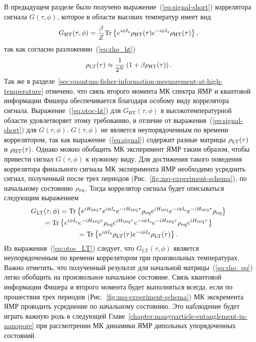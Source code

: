 В предыдущем разделе было получено выражение~(\ref{eq:signal-short}) коррелятора сигнала $G(\tau, \phi)$,
которое в области высоких температур имеет вид
%
\begin{equation}\label{eq:otoc-ht}
    G_\mathrm{HT}(\tau, \phi) = \frac \beta Z\mathrm{Tr} \left\{ 
    e^{i \phi I_\mathrm{z}}
    \rho_\mathrm{HT} (\tau)
    e^{-i \phi I_\mathrm{z}}
    \rho_\mathrm{HT}(\tau)
     \right\},
\end{equation}
%
так как согласно разложению~(\ref{eq:rho_ht})
%
\begin{equation}
  \rho_\mathrm{LT} (\tau) \approx \frac{1}{2^N}\left( 1 + \beta \rho_\mathrm{HT} (\tau) \right).
\end{equation}
%
Так же в разделе~\ref{sec:quantum-fisher-information-mesuarement-at-high-temperature} отмечено,
что связь второго момента МК спектра ЯМР и квантовой информации Фишера
обеспечивается благодаря особому виду коррелятора сигнала.
Выражение~(\ref{eq:otoc-ht}) для $G_\mathrm{HT}(\tau, \phi)$
в высокотемпературной области
удовлетворяет этому требованию,
в отличие от выражения~(\ref{eq:signal-short}) для $G(\tau, \phi)$.
$G(\tau, \phi)$ не является неупорядоченным по времени коррелятором,
так как выражение~(\ref{eq:signal}) содержит разные матрицы $\rho_\mathrm{LT}(\tau)$ и $\rho_\mathrm{HT}(\tau)$.
Однако можно обобщить МК эксперимент ЯМР  таким образом,
чтобы привести сигнал $G(\tau, \phi)$ к нужному виду.
Для достижения такого поведения коррелятора финального сигнала МК эксперимента ЯМР
необходимо усреднить сигнал,
полученный после трех периодов %
(Рис.~\ref{fig:mq-experiment-schema}),
по начальному состоянию $\rho_\mathrm{eq}$.
Тогда коррелятор сигнала будет описываться следующим выражением
%
\begin{multline}
  \label{eq:otoc_LT}
  G_\mathrm{LT}(\tau, \phi) =
  \mathrm{Tr} \left\{ 
    e^{i H_{\mathrm{MQ}} \tau}
    e^{i \phi I_\mathrm{z}}
    e^{-i H_{\mathrm{MQ}} \tau}
    \rho_{\mathrm{eq}}
    e^{i H_{\mathrm{MQ}}}
    e^{-i \phi I_\mathrm{z}}
    e^{-i H_{\mathrm{MQ}} \tau}
    \rho_{\mathrm{eq}}
   \right\} \\ =
  \mathrm{Tr} \left\{ 
    e^{i \phi I_\mathrm{z}}
    e^{-i H_\mathrm{MQ} \tau}
    \rho_\mathrm{eq}
    e^{i H_\mathrm{MQ} \tau}
    e^{-i \phi I_\mathrm{z}}
    e^{-i H_\mathrm{MQ} \tau}
    \rho_{\mathrm{eq}}
    e^{i H_\mathrm{MQ} \tau}
   \right\} \\ =
  \mathrm{Tr} \left\{ 
    e^{i \phi I_\mathrm{z}}
    \rho_\mathrm{LT} (\tau)
    e^{-i \phi I_\mathrm{z}}
    \rho_\mathrm{LT} (\tau)
   \right\}.
\end{multline}
%
Из выражения~(\ref{eq:otoc_LT}) следует,
что $G_\mathrm{LT}(\tau, \phi)$ является неупорядоченным по времени коррелятором при произвольных температурах.
Важно отметить,
что полученный результат для начальной матрицы~(\ref{eq:rho_eq}) легко обобщить
на произвольное начальное состояние.
Связь квантовой информации Фишера и второго момента будет выполняться всегда,
если по прошествии трех периодов (Рис.~\ref{fig:mq-experiment-schema}) МК экскремента ЯМР
проводить усреднение по начальному состоянию.
Это наблюдение будет играть важную роль в следующей Главе~\ref{chapter:manyparticle-entanglement-in-nanopore}
при рассмотрении МК динамики ЯМР дипольных упорядоченных состояний.

